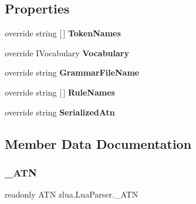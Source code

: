 \subsection*{Properties}
\begin{DoxyCompactItemize}
\item 
\mbox{\label{classzlua_1_1_lua_parser_a6bf1300d2644e6d1fe17cfae05ccc923}} 
override string \mbox{[}$\,$\mbox{]} {\bfseries Token\+Names}
\item 
\mbox{\label{classzlua_1_1_lua_parser_a6c5a04c2c88845d48905d74854c3e6c7}} 
override I\+Vocabulary {\bfseries Vocabulary}
\item 
\mbox{\label{classzlua_1_1_lua_parser_aa23aa314a2ef044d077e3ab7e095c7ca}} 
override string {\bfseries Grammar\+File\+Name}
\item 
\mbox{\label{classzlua_1_1_lua_parser_a96ce9d086ad08c4d5ef5cd3d4c92f874}} 
override string \mbox{[}$\,$\mbox{]} {\bfseries Rule\+Names}
\item 
\mbox{\label{classzlua_1_1_lua_parser_ad4eb05ec5026ae7bb646f6d56849e6f2}} 
override string {\bfseries Serialized\+Atn}
\end{DoxyCompactItemize}


\subsection{Member Data Documentation}
\mbox{\label{classzlua_1_1_lua_parser_a215461bfd16e78ebcf0fa5aeec65dd44}} 
\subsubsection{\texorpdfstring{\+\_\+\+A\+TN}{\_ATN}}
{\footnotesize\ttfamily readonly A\+TN zlua.\+Lua\+Parser.\+\_\+\+A\+TN\hspace{0.3cm}{\ttfamily [static]}}

